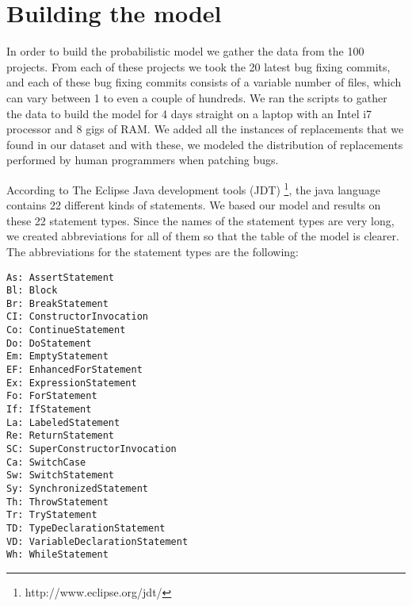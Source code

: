 
\section{Building the model}

In order to build the probabilistic model we gather the data from the 100 projects. From each of these projects we took the 20 latest bug fixing commits, and each of these bug fixing commits consists of a variable number of files, which can vary between 1 to even a couple of hundreds.
We ran the scripts to gather the data to build the model for 4 days straight on a laptop with an Intel i7 processor and 8 gigs of RAM. We added all the instances of replacements that we found in our dataset and with these, we modeled the distribution of replacements performed by human programmers when patching bugs.

According to The Eclipse Java development tools (JDT) \footnote{http://www.eclipse.org/jdt/}, the java language contains 22 different kinds of statements. We based our model and results on these 22 statement types. Since the names of the statement types are very long, we created abbreviations for all of them so that the table of the model is clearer. The abbreviations for the statement types are the following:

\begin{verbatim}
As: AssertStatement
Bl: Block
Br: BreakStatement
CI: ConstructorInvocation
Co: ContinueStatement
Do: DoStatement
Em: EmptyStatement
EF: EnhancedForStatement
Ex: ExpressionStatement
Fo: ForStatement
If: IfStatement
La: LabeledStatement
Re: ReturnStatement
SC: SuperConstructorInvocation
Ca: SwitchCase
Sw: SwitchStatement
Sy: SynchronizedStatement
Th: ThrowStatement
Tr: TryStatement
TD: TypeDeclarationStatement
VD: VariableDeclarationStatement
Wh: WhileStatement
\end{verbatim}



